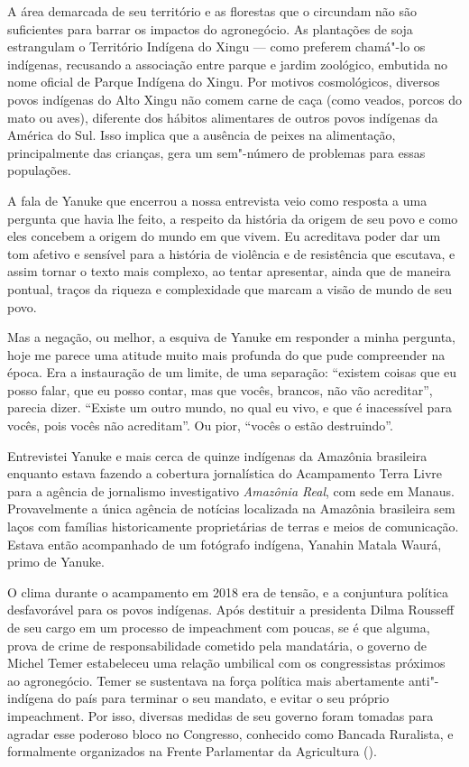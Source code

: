 A área demarcada de seu território e as florestas que o circundam não
são suficientes para barrar os impactos do agronegócio.
As plantações de soja estrangulam o Território Indígena do
Xingu --- como preferem chamá"-lo os indígenas, recusando a associação
entre parque e jardim zoológico, embutida no nome oficial de Parque
Indígena do Xingu. Por motivos cosmológicos, diversos povos indígenas do Alto Xingu
não comem carne de caça (como veados, porcos do mato ou aves), diferente
dos hábitos alimentares de outros povos indígenas da América do
Sul. Isso implica que a ausência de peixes na alimentação,
principalmente das crianças, gera um sem"-número de problemas para essas populações.

A fala de Yanuke que encerrou a nossa entrevista veio como resposta a
uma pergunta que havia lhe feito, a respeito da história da origem de
seu povo e como eles concebem a origem do mundo em que vivem. Eu
acreditava poder dar um tom afetivo e sensível para a história de
violência e de resistência que escutava, e assim tornar o texto mais
complexo, ao tentar apresentar, ainda que de maneira pontual, traços da
riqueza e complexidade que marcam a visão de mundo de seu povo.

Mas a negação, ou melhor, a esquiva de Yanuke em responder a minha
pergunta, hoje me parece uma atitude muito mais profunda do que pude
compreender na época. Era a instauração de um limite, de uma separação:
``existem coisas que eu posso falar, que eu posso contar, mas que vocês,
brancos, não vão acreditar'', parecia dizer. ``Existe um outro mundo, no
qual eu vivo, e que é inacessível para vocês, pois vocês não
acreditam''. Ou pior, ``vocês o estão destruindo''.

\asterisc

Entrevistei Yanuke e mais cerca de quinze indígenas da Amazônia
brasileira enquanto estava fazendo a cobertura jornalística do
Acampamento Terra Livre para a agência de jornalismo investigativo
\emph{Amazônia Real}, com sede em Manaus. Provavelmente a única agência de
notícias localizada na Amazônia brasileira sem laços com famílias
historicamente proprietárias de terras e meios de comunicação. Estava
então acompanhado de um fotógrafo indígena, Yanahin Matala Waurá, primo
de Yanuke.

O clima durante o acampamento em 2018 era de tensão, e a conjuntura
política desfavorável para os povos indígenas. Após destituir a
presidenta Dilma Rousseff de seu cargo em um processo de impeachment com
poucas, se é que alguma, prova de crime de responsabilidade cometido
pela mandatária, o governo de Michel Temer estabeleceu uma relação
umbilical com os congressistas próximos ao agronegócio. Temer se
sustentava na força política mais abertamente anti"-indígena do país para
terminar o seu mandato, e evitar o seu próprio impeachment. Por isso,
diversas medidas de seu governo foram tomadas para agradar esse poderoso
bloco no Congresso, conhecido como Bancada Ruralista, e formalmente
organizados na Frente Parlamentar da Agricultura ().

